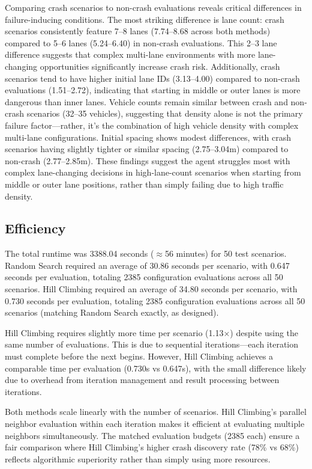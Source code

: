 \documentclass[11pt,a4paper]{article}
\begin{document}
Comparing crash scenarios to non-crash evaluations reveals critical differences in failure-inducing conditions. The most striking difference is lane count: crash scenarios consistently feature 7--8 lanes (7.74--8.68 across both methods) compared to 5--6 lanes (5.24--6.40) in non-crash evaluations. This 2--3 lane difference suggests that complex multi-lane environments with more lane-changing opportunities significantly increase crash risk. Additionally, crash scenarios tend to have higher initial lane IDs (3.13--4.00) compared to non-crash evaluations (1.51--2.72), indicating that starting in middle or outer lanes is more dangerous than inner lanes. Vehicle counts remain similar between crash and non-crash scenarios (32--35 vehicles), suggesting that density alone is not the primary failure factor---rather, it's the combination of high vehicle density with complex multi-lane configurations. Initial spacing shows modest differences, with crash scenarios having slightly tighter or similar spacing (2.75--3.04m) compared to non-crash (2.77--2.85m). These findings suggest the agent struggles most with complex lane-changing decisions in high-lane-count scenarios when starting from middle or outer lane positions, rather than simply failing due to high traffic density.

\subsection{Efficiency}

The total runtime was 3388.04 seconds ($\approx$56 minutes) for 50 test scenarios. Random Search required an average of 30.86 seconds per scenario, with 0.647 seconds per evaluation, totaling 2385 configuration evaluations across all 50 scenarios. Hill Climbing required an average of 34.80 seconds per scenario, with 0.730 seconds per evaluation, totaling 2385 configuration evaluations across all 50 scenarios (matching Random Search exactly, as designed).

Hill Climbing requires slightly more time per scenario (1.13$\times$) despite using the same number of evaluations. This is due to sequential iterations---each iteration must complete before the next begins. However, Hill Climbing achieves a comparable time per evaluation (0.730s vs 0.647s), with the small difference likely due to overhead from iteration management and result processing between iterations.

Both methods scale linearly with the number of scenarios. Hill Climbing's parallel neighbor evaluation within each iteration makes it efficient at evaluating multiple neighbors simultaneously. The matched evaluation budgets (2385 each) ensure a fair comparison where Hill Climbing's higher crash discovery rate (78\% vs 68\%) reflects algorithmic superiority rather than simply using more resources.
\end{document}
